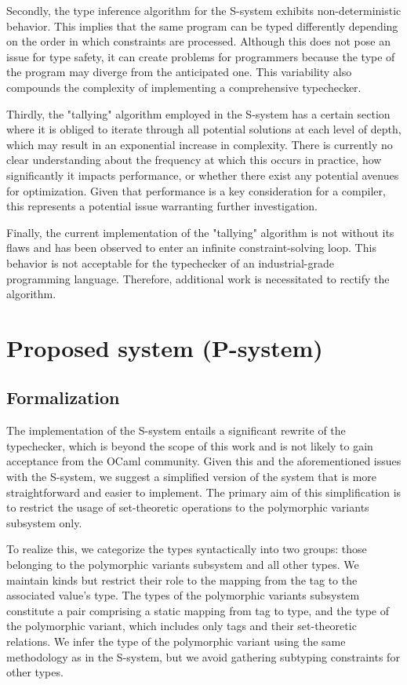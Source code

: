 \documentclass[a4paper,11pt,oneside]{article}
\theoremstyle{definition}
\begin{document}
Secondly, the type inference algorithm for the S-system exhibits non-deterministic behavior. This implies that the same program can be typed differently depending on the order in which constraints are processed. Although this does not pose an issue for type safety, it can create problems for programmers because the type of the program may diverge from the anticipated one. This variability also compounds the complexity of implementing a comprehensive typechecker.

Thirdly, the "tallying" algorithm employed in the S-system has a certain section where it is obliged to iterate through all potential solutions at each level of depth, which may result in an exponential increase in complexity. There is currently no clear understanding about the frequency at which this occurs in practice, how significantly it impacts performance, or whether there exist any potential avenues for optimization. Given that performance is a key consideration for a compiler, this represents a potential issue warranting further investigation.

Finally, the current implementation of the "tallying" algorithm is not without its flaws and has been observed to enter an infinite constraint-solving loop. This behavior is not acceptable for the typechecker of an industrial-grade programming language. Therefore, additional work is necessitated to rectify the algorithm.

\section{Proposed system (P-system)}

\subsection{Formalization}

The implementation of the S-system entails a significant rewrite of the typechecker, which is beyond the scope of this work and is not likely to gain acceptance from the OCaml community. Given this and the aforementioned issues with the S-system, we suggest a simplified version of the system that is more straightforward and easier to implement. The primary aim of this simplification is to restrict the usage of set-theoretic operations to the polymorphic variants subsystem only.

To realize this, we categorize the types syntactically into two groups: those belonging to the polymorphic variants subsystem and all other types. We maintain kinds but restrict their role to the mapping from the tag to the associated value's type. The types of the polymorphic variants subsystem constitute a pair comprising a static mapping from tag to type, and the type of the polymorphic variant, which includes only tags and their set-theoretic relations. We infer the type of the polymorphic variant using the same methodology as in the S-system, but we avoid gathering subtyping constraints for other types.
\end{document}
